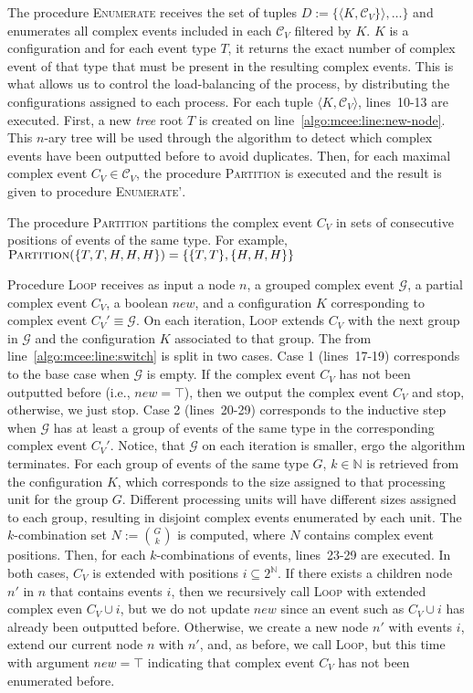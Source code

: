 The procedure \textsc{Enumerate} receives the set of tuples $D := \{\langle K, \mathcal{C}_{V}\} \rangle, \ldots \}$ and enumerates all complex events included in each $\mathcal{C}_{V}$ filtered by $K$. $K$ is a configuration and for each event type $T$, it returns the exact number of complex event of that type that must be present in the resulting complex events. This is what allows us to control the load-balancing of the process, by distributing the configurations assigned to each process. For each tuple $\langle K, \mathcal{C}_{V} \rangle$, lines~10-13 are executed. First, a new \emph{tree} root $T$ is created on line~\ref{algo:mcee:line:new-node}. This $n$-ary tree will be used through the algorithm to detect which complex events have been outputted before to avoid duplicates. Then, for each maximal complex event $C_{V} \in \mathcal{C}_{V}$, the procedure \textsc{Partition} is executed and the result is given to procedure \textsc{Enumerate'}.

The procedure \textsc{Partition} partitions the complex event $C_{V}$ in sets of consecutive positions of events of the same type. For example, \newline
\hspace*{60pt}$\textsc{Partition}(\{T, T, H, H, H\}) = \{\{T,T\}, \{H,H,H\}\}$

Procedure \textsc{Loop} receives as input a node $n$, a grouped complex event $\mathcal{G}$, a partial complex event $C_{V}$, a boolean $new$, and a configuration $K$ corresponding to complex event $C_{V}' \equiv \mathcal{G}$. On each iteration, \textsc{Loop} extends $C_{V}$ with the next group in $\mathcal{G}$ and the configuration $K$ associated to that group. The  from line~\ref{algo:mcee:line:switch} is split in two cases. Case 1 (lines~17-19) corresponds to the base case when $\mathcal{G}$ is empty. If the complex event $C_{V}$ has not been outputted before (i.e., $new = \top$), then we output the complex event $C_{V}$ and stop, otherwise, we just stop. Case 2 (lines~20-29) corresponds to the inductive step when $\mathcal{G}$ has at least a group of events of the same type in the corresponding complex event $C_{V}'$. Notice, that $\mathcal{G}$ on each iteration is smaller, ergo the algorithm terminates. For each group of events of the same type $G$, $k \in \mathbb{N}$ is retrieved from the configuration $K$, which corresponds to the size assigned to that processing unit for the group $G$. Different processing units will have different sizes assigned to each group, resulting in disjoint complex events enumerated by each unit. The $k$-combination set $N := \binom{G}{k}$ is computed, where $N$ contains complex event positions. Then, for each $k$-combinations of events, lines~23-29 are executed. In both cases, $C_{V}$ is extended with positions $i \subseteq 2^{\mathbb{N}}$. If there exists a children node $n'$ in $n$ that contains events $i$, then we recursively call \textsc{Loop} with extended complex even $C_{V} \cup i$, but we do not update $new$ since an event such as $C_{V} \cup i$ has already been outputted before. Otherwise, we create a new node $n'$ with events $i$, extend our current node $n$ with $n'$, and, as before, we call \textsc{Loop}, but this time with argument $new = \top$ indicating that complex event $C_{V}$ has not been enumerated before.
